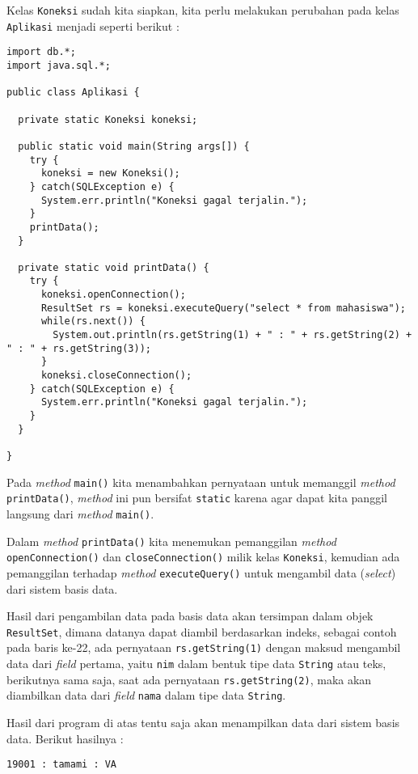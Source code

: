 Kelas \texttt{Koneksi} sudah kita siapkan, kita perlu melakukan perubahan pada kelas \texttt{Aplikasi} menjadi seperti berikut :

\begin{lstlisting}
import db.*;
import java.sql.*;

public class Aplikasi {

  private static Koneksi koneksi;
  
  public static void main(String args[]) {
    try {
      koneksi = new Koneksi();
    } catch(SQLException e) {
      System.err.println("Koneksi gagal terjalin.");
    }
    printData();
  }
  
  private static void printData() {
    try {
      koneksi.openConnection();
      ResultSet rs = koneksi.executeQuery("select * from mahasiswa");
      while(rs.next()) {
        System.out.println(rs.getString(1) + " : " + rs.getString(2) + " : " + rs.getString(3));
      }
      koneksi.closeConnection();
    } catch(SQLException e) {
      System.err.println("Koneksi gagal terjalin.");
    }
  }
  
}
\end{lstlisting}

Pada \textit{method} \texttt{main()} kita menambahkan pernyataan untuk memanggil \textit{method} \texttt{printData()}, \textit{method} ini pun bersifat \texttt{static} karena agar dapat kita panggil langsung dari \textit{method} \texttt{main()}.

Dalam \textit{method} \texttt{printData()} kita menemukan pemanggilan \textit{method} \texttt{openConnection()} dan \texttt{closeConnection()} milik kelas \texttt{Koneksi}, kemudian ada pemanggilan terhadap \textit{method} \texttt{executeQuery()} untuk mengambil data (\textit{select}) dari sistem basis data. 

Hasil dari pengambilan data pada basis data akan tersimpan dalam objek \texttt{ResultSet}, dimana datanya dapat diambil berdasarkan indeks, sebagai contoh pada baris ke-22, ada pernyataan \texttt{rs.getString(1)} dengan maksud mengambil data dari \textit{field} pertama, yaitu \texttt{nim} dalam bentuk tipe data \texttt{String} atau teks, berikutnya sama saja, saat ada pernyataan \texttt{rs.getString(2)}, maka akan diambilkan data dari \textit{field} \texttt{nama} dalam tipe data \texttt{String}.

Hasil dari program di atas tentu saja akan menampilkan data dari sistem basis data. Berikut hasilnya :

\begin{lstlisting}
19001 : tamami : VA
\end{lstlisting}

